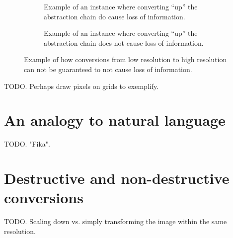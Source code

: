 \documentclass{scrreprt}
\begin{document}
\begin{figure}[h]

\begin{subfigure}{.5\textwidth}
  \centering

  \caption{Example of an instance where converting ``up'' the abstraction chain do cause loss of information.}
  \label{fig:low-to-high-resolution-destructive}
\end{subfigure}%
\begin{subfigure}{.5\textwidth}
  \centering

  \caption{Example of an instance where converting ``up'' the abstraction chain does not cause loss of information.}
  \label{fig:low-to-high-resolution-non-destructive}
\end{subfigure}

\caption{Example of how conversions from low resolution to high resolution can not be guaranteed to not cause loss of information.}
\end{figure}



TODO. Perhaps draw pixels on grids to exemplify.





\section{An analogy to natural language}
TODO. "Fika".





\section{Destructive and non-destructive conversions}
TODO. Scaling down vs. simply transforming the image within the same resolution.
\end{document}
